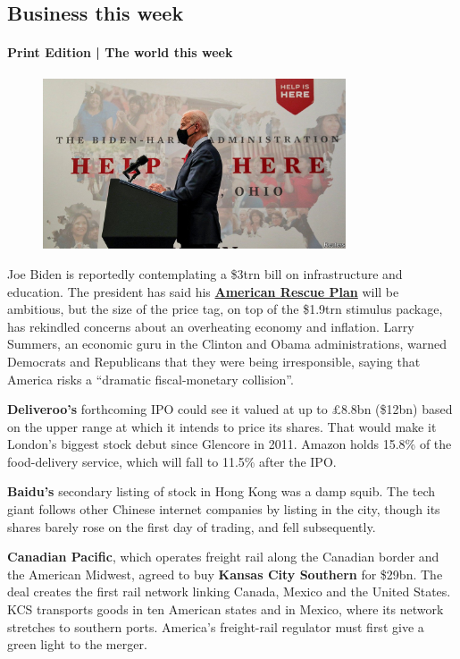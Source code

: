 \documentclass{article}
\begin{document}
\subsection{Business this week }
\paragraph{Print Edition | The world this week  \quad \color{gray}{Mar 25th 2021 }}
\begin{figure}[h]
\centering
\includegraphics[width=0.8\textwidth]{images/20210327_wwp501.jpg}
\end{figure}
Joe Biden is reportedly contemplating a \$3trn bill on infrastructure and education. The president has said his \href{/finance-and-economics/2021/03/25/just-how-anchored-are-americas-inflation-expectations}{\textbf{American Rescue Plan}} will be ambitious, but the size of the price tag, on top of the \$1.9trn stimulus package, has rekindled concerns about an overheating economy and inflation. Larry Summers, an economic guru in the Clinton and Obama administrations, warned Democrats and Republicans that they were being irresponsible, saying that America risks a ``dramatic fiscal-monetary collision''. 

\textbf{Deliveroo's} forthcoming IPO could see it valued at up to £8.8bn (\$12bn) based on the upper range at which it intends to price its shares. That would make it London's biggest stock debut since Glencore in 2011. Amazon holds 15.8\% of the food-delivery service, which will fall to 11.5\% after the IPO. 

\textbf{Baidu's} secondary listing of stock in Hong Kong was a damp squib. The tech giant follows other Chinese internet companies by listing in the city, though its shares barely rose on the first day of trading, and fell subsequently. 

\textbf{Canadian Pacific}, which operates freight rail along the Canadian border and the American Midwest, agreed to buy \textbf{Kansas City Southern} for \$29bn. The deal creates the first rail network linking Canada, Mexico and the United States. KCS transports goods in ten American states and in Mexico, where its network stretches to southern ports. America's freight-rail regulator must first give a green light to the merger. 
\end{document}
